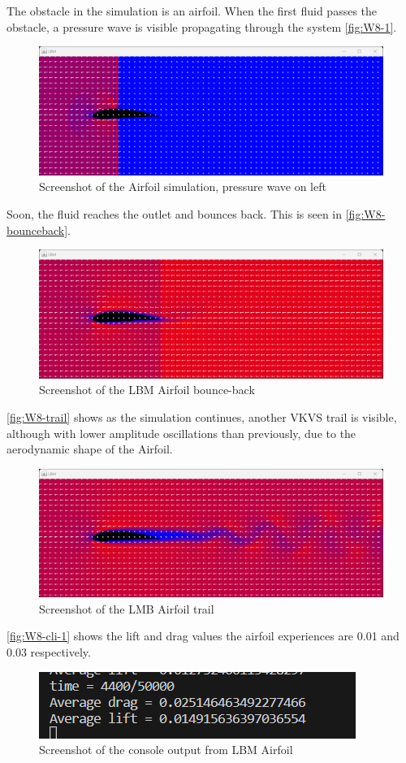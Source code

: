 The obstacle in the simulation is an airfoil. When the first fluid passes the obstacle, a pressure wave is visible propagating through the system \autoref{fig:W8-1}.
\begin{figure}[H] 
    \centering
    \includegraphics[width=0.6\columnwidth]{Figures/Week 8/1.png}
    \caption{Screenshot of the Airfoil simulation, pressure wave on left}
    \label{fig:W8-1}
\end{figure}
Soon, the fluid reaches the outlet and bounces back. This is seen in \autoref{fig:W8-bounceback}.
\begin{figure}[H]   
    \centering
    \includegraphics[width=0.49\columnwidth]{Figures/Week 8/bounceback.png}
    \caption{Screenshot of the LBM Airfoil bounce-back}
    \label{fig:W8-bounceback}
\end{figure}
\autoref{fig:W8-trail} shows as the simulation continues, another VKVS trail is visible, although with lower amplitude oscillations than previously, due to the aerodynamic shape of the Airfoil.
\begin{figure}[H] 
    \centering
    \includegraphics[width=0.49\columnwidth]{Figures/Week 8/trail.png}
    \caption{Screenshot of the LMB Airfoil trail}
    \label{fig:W8-trail}
\end{figure}

\autoref{fig:W8-cli-1} shows the lift and drag values the airfoil experiences are 0.01 and 0.03 respectively.
\begin{figure}[H] 
    \centering
    \includegraphics[width=0.49\columnwidth]{Figures/Week 8/cli.png}
    \caption{Screenshot of the console output from LBM Airfoil }
    \label{fig:W8-cli-1}
\end{figure}

